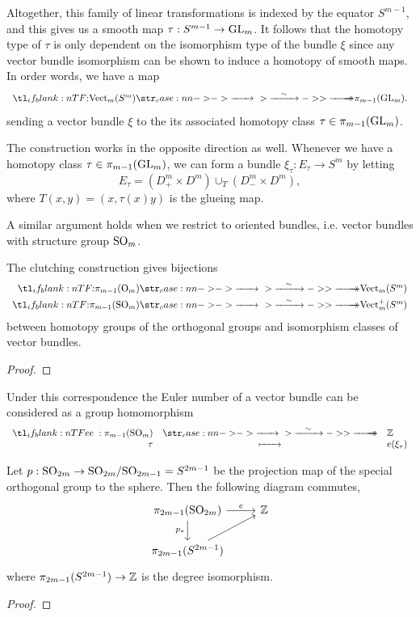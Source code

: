 Altogether, this family of linear transformations is indexed by the equator $S^{m-1}$, and this gives us a smooth map $\tau : S^{m-1}\to {\operatorname{GL}}_m$. It follows that the homotopy type of $\tau$ is only dependent on the isomorphism type of the bundle $\xi$ since any vector bundle isomorphism can be shown to induce a homotopy of smooth maps. In order words, we have a map
\[
	\lkxfunc{}{\op{Vect}_m(S^m)}{\pi_{m-1}(\GL_m).}
\]
sending a vector bundle $\xi$ to the its associated homotopy class $\tau\in \pi_{m-1}({\operatorname{GL}}_m)$.

The construction works in the opposite direction as well. Whenever we have a homotopy class $\tau\in \pi_{m-1}({\operatorname{GL}}_m)$, we can form a bundle $\xi_\tau : E_\tau \to S^{m}$ by letting
\[
	E_\tau = (D_+^m\times D^m)\cup_T (D_-^{m}\times D^m),
\]
where $T(x,y)=(x,\tau(x)y)$ is the glueing map.


A similar argument holds when we restrict to oriented bundles, i.e. vector bundles with structure group ${\operatorname{SO}}_m$.

\begin{theorem}
	The clutching construction gives bijections
	\[
		\begin{aligned}
			\lkxfunc{}{\pi_{m-1}(\O_m)}{\op{Vect}_m(S^m)} \\
			\lkxfunc{}{\pi_{m-1}(\SO_m)}{\op{Vect}_m^+(S^m)}
		\end{aligned}
	\]
	between homotopy groups of the orthogonal groups and isomorphism classes of vector bundles.
\end{theorem}
\begin{proof}
\end{proof}

Under this correspondence the Euler number of a vector bundle can be considered as a group homomorphism
\[
	\lkxfunc{e}{\pi_{m-1}(\SO_m)}{\Z}{\tau}{e(\xi_\tau)}
\]
\begin{theorem}\label{thm:euler-number-of-vector-bundle-over-sphere}
	Let $p : {\operatorname{SO}}_{2m} \to {\operatorname{SO}}_{2m}/{\operatorname{SO}}_{2m-1}= S^{2m-1}$ be the projection map of the special orthogonal group to the sphere. Then the following diagram commutes,
	\[\begin{tikzcd}
			{\pi_{2m-1}(\SO_{2m})} & \Z \\
			{\pi_{2m-1}(S^{2m-1})}
			\arrow["e", from=1-1, to=1-2]
			\arrow["{p_*}"', from=1-1, to=2-1]
			\arrow[from=2-1, to=1-2]
		\end{tikzcd}\]
	where $\pi_{2m-1}(S^{2m-1})\to \mathbb{Z}$ is the degree isomorphism.
\end{theorem}
\begin{proof}
\end{proof}

